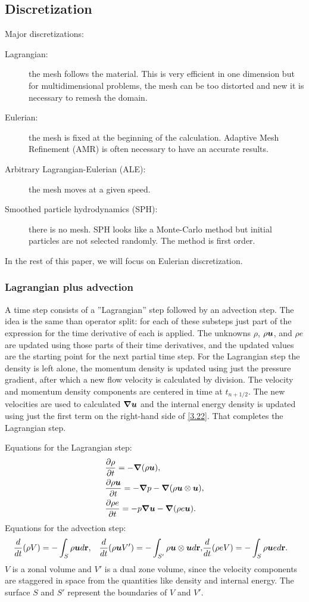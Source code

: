 \subsection{Discretization}
Major discretizations:
\begin{description}
  \item[Lagrangian:] the mesh follows the material. This is very efficient in
    one dimension but for multidimensional problems, the mesh can be too
    distorted and new it is necessary to remesh the domain.
  \item[Eulerian:] the mesh is fixed at the beginning of the calculation.
    Adaptive Mesh Refinement (AMR) is often necessary to have an accurate
    results.
  \item[Arbitrary Lagrangian-Eulerian (ALE):] the mesh moves at a given speed.
  \item[Smoothed particle hydrodynamics (SPH):] there is no mesh. SPH looks
    like a Monte-Carlo method but initial particles are not selected randomly.
    The method is first order.
\end{description}
In the rest of this paper, we will focus on Eulerian discretization.
\subsubsection{Lagrangian plus advection}
A time step consists of a ''Lagrangian'' step followed by an advection step.
The idea is the same than operator split: for each of these substeps just part
of the expression for the time derivative of each  is applied. The unknowns
$\rho$, $\rho\boldsymbol{u}$, and $\rho e$ are updated using those parts of their time
derivatives, and the updated values are the starting point for the next
partial time step. For the Lagrangian step the density is left alone, the
momentum density is updated using just the pressure gradient, after which a
new flow velocity is calculated by division. The velocity and momentum density
components are centered in time at $t_{n+1/2}$. The new velocities are used to
calculated $\boldsymbol{\nabla}\boldsymbol{u}$ and the internal energy density is updated using just
the first term on the right-hand side of \cref{3.22}. That completes the
Lagrangian step.

Equations for the Lagrangian step:
\begin{align}
  &\frac{\partial \rho}{\partial t} = -\boldsymbol{\nabla} (\rho \boldsymbol{u}),\\
  &\frac{\partial \rho \boldsymbol{u}}{\partial t} = -\boldsymbol{\nabla} p - \boldsymbol{\nabla}(\rho
  \boldsymbol{u}\otimes\boldsymbol{u}),\\
  &\frac{\partial \rho e}{\partial t} = -p\boldsymbol{\nabla}\boldsymbol{u} - \boldsymbol{\nabla} (\rho e \boldsymbol{u})
  \label{3.22}.
\end{align}
Equations for the advection step:
\begin{align}
  &\frac{d}{dt}(\rho V) = -\int_S \rho \boldsymbol{u}d\mathbf{r},
  &\frac{d}{dt}(\rho \boldsymbol{u}V') = -\int_{S'} \rho \boldsymbol{u}\otimes\boldsymbol{u} d\mathbf{r},
  &\frac{d}{dt}(\rho e V) = -\int_S \rho \boldsymbol{u}e d\mathbf{r}.
\end{align}
$V$ is a zonal volume and $V'$ is a dual zone volume, since the velocity
components are staggered in space from the quantities like density and
internal energy. The surface $S$ and $S'$ represent the boundaries of $V$ and
$V'$.
